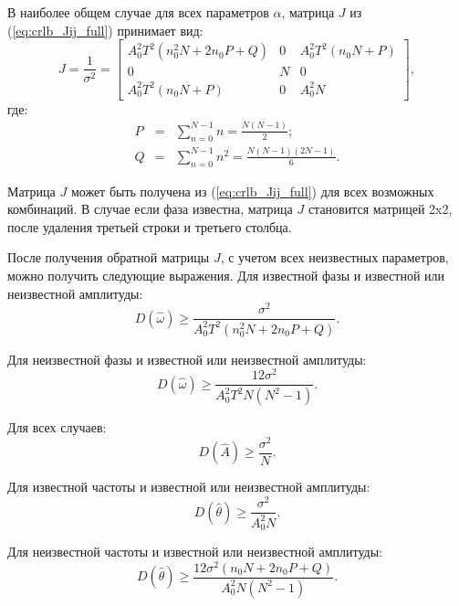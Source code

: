 В наиболее общем случае для всех параметров ${\alpha}$, матрица ${J}$ из (\ref{eq:crlb_Jij_full}) принимает вид:
\begin{equation}
	J = \frac{1}{\sigma^2} =
		\left[ \begin{array}{ccc}
			A_0^2 T^2 (n_0^2 N + 2n_0P + Q) & 0 & A_0^2 T^2 (n_0 N + P) \\
			0 & N & 0 \\
			A_0^2 T^2 (n_0 N + P) & 0 & A_0^2N
		\end{array} \right],
\end{equation}
где:
\begin{eqnarray}
	\label{eq:clrb_QP}
	P & = & \sum_{n=0}^{N-1}n = \frac{N(N-1)}{2}; \\
	Q & = & \sum_{n=0}^{N-1}n^2 = \frac{N(N-1)(2N-1)}{6}.
\end{eqnarray}

Матрица ${J}$ может быть получена из (\ref{eq:crlb_Jij_full}) для всех возможных комбинаций. В случае если фаза известна, матрица ${J}$ становится матрицей 2x2, после удаления третьей строки
и третьего столбца.

После получения обратной матрицы ${J}$, с учетом всех неизвестных параметров, можно получить следующие выражения.
Для известной фазы и известной или неизвестной амплитуды:
\begin{equation}
	\label{eq:clrb_est_omega_1}
	D(\hat{\omega}) \ge \frac{\sigma^2}{A_0^2 T^2 (n_0^2 N + 2n_0P + Q)}.
\end{equation}

Для неизвестной фазы и известной или неизвестной амплитуды:
\begin{equation}
	\label{eq:clrb_est_omega_2}
	D(\hat{\omega}) \ge \frac{12\sigma^2}{A_0^2 T^2N(N^2-1)}.
\end{equation}

Для всех случаев:
\begin{equation}
	\label{eq:clrb_est_b_1}
	D(\hat{A}) \ge \frac{\sigma^2}{N}.
\end{equation}

Для известной частоты и известной или неизвестной амплитуды:
\begin{equation}
	\label{eq:clrb_est_b_1}
	D(\hat{\theta}) \ge \frac{\sigma^2}{A_0^2N}.
\end{equation}

Для неизвестной частоты и известной или неизвестной амплитуды:
\begin{equation}
	\label{eq:clrb_est_b_1}
	D(\hat{\theta}) \ge \frac{12\sigma^2(n_0N + 2n_0P + Q)}{A_0^2N(N^2-1)}.
\end{equation}

